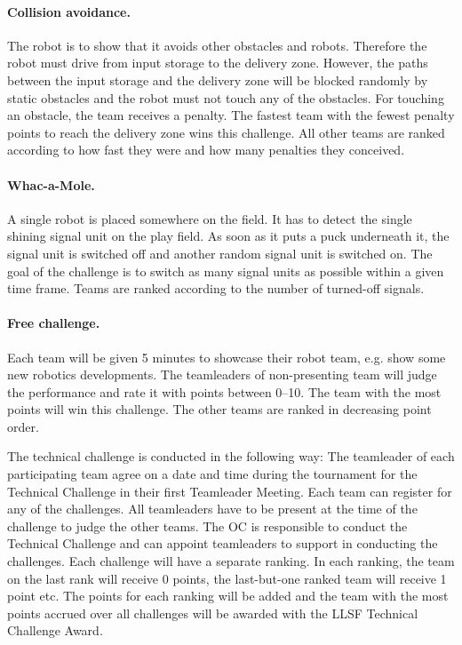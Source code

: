 \documentclass[12pt,twoside]{article}
\begin{document}
  \paragraph{Collision avoidance.~}
  The robot is to show that it avoids other obstacles and robots.
  Therefore the robot must drive from input storage to the delivery zone.
  However, the paths between the input storage and the delivery zone will
  be blocked randomly by static obstacles and the robot must not touch any
  of the obstacles. For touching an obstacle, the team receives a penalty.
  The fastest team with the fewest penalty points to reach the delivery
  zone wins this challenge. All other teams are ranked according to
  how fast they were and how many penalties they conceived.
  
  \paragraph{Whac-a-Mole.~}
  A single robot is placed somewhere on the field. It has to detect
  the single shining signal unit on the play field. As soon as it puts
  a puck underneath it, the signal unit is switched off and another
  random signal unit is switched on. The goal of the challenge is to
  switch as many signal units as possible within a given time
  frame. Teams are ranked according to the number of turned-off
  signals.
  
  \paragraph{Free challenge.~}
  Each team will be given 5 minutes to showcase their robot team, e.g.
  show some new robotics developments. The teamleaders of
  non-presenting team will judge the performance and rate it with
  points between 0--10.  The team with the most points will win this
  challenge. The other teams are ranked in decreasing point order.


  The technical challenge is conducted in the following way: The
  teamleader of each participating team agree on a date and time
  during the tournament for the Technical Challenge in their first
  Teamleader Meeting. Each team can register for any of the
  challenges. All teamleaders have to be present at the time of the
  challenge to judge the other teams. The OC is responsible to conduct
  the Technical Challenge and can appoint teamleaders to support in
  conducting the challenges. Each challenge will have a separate
  ranking. In each ranking, the team on the last rank will receive 0
  points, the last-but-one ranked team will receive 1 point etc. The
  points for each ranking will be added and the team with the most
  points accrued over all challenges will be awarded with the
  LLSF Technical Challenge Award.
\end{document}
